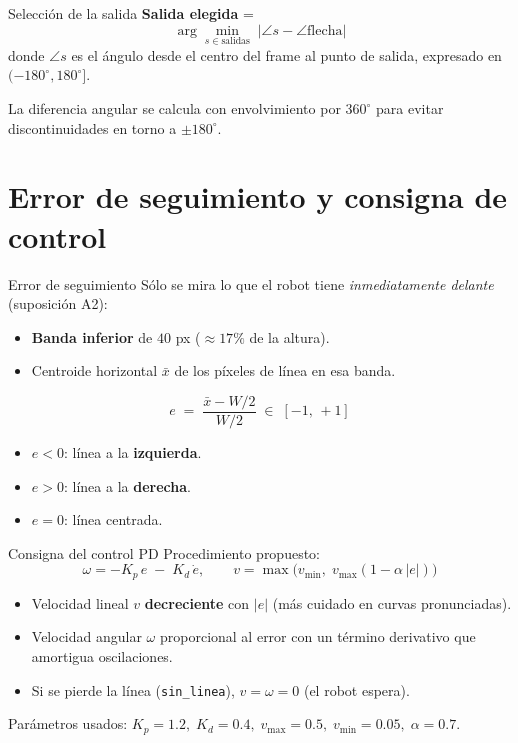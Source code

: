 \begin{frame}{Selección de la salida}
\textbf{Salida elegida} =
\[
   \arg\min_{s \in \text{salidas}}\; \bigl|\angle s - \angle \text{flecha}\bigr|
\]
donde $\angle s$ es el ángulo desde el centro del frame al punto de salida, expresado en $(-180^{\circ},180^{\circ}]$.

\medskip
La diferencia angular se calcula con envolvimiento por $360^{\circ}$ para evitar discontinuidades en torno a $\pm 180^{\circ}$.
\end{frame}


\section{Error de seguimiento y consigna de control}

\begin{frame}{Error de seguimiento}
Sólo se mira lo que el robot tiene \emph{inmediatamente delante} (suposición A2):
\begin{itemize}
  \item \textbf{Banda inferior} de $40$ px ($\approx 17\%$ de la altura).
  \item Centroide horizontal $\bar{x}$ de los píxeles de línea en esa banda.
\end{itemize}

\medskip
\[
e \;=\; \frac{\bar{x} - W/2}{W/2} \;\in\; [-1,\,+1]
\]

\begin{itemize}
  \item $e<0$: línea a la \textbf{izquierda}.
  \item $e>0$: línea a la \textbf{derecha}.
  \item $e=0$: línea centrada.
\end{itemize}
\end{frame}

\begin{frame}{Consigna del control PD}
Procedimiento propuesto:
\[
\boxed{\;\;
\omega = -K_p\, e \;-\; K_d\, \dot{e},\qquad
v = \max\!\bigl(v_{\min},\; v_{\max}(1 - \alpha\,|e|)\bigr) \;\;}
\]

\begin{itemize}
  \item Velocidad lineal $v$ \textbf{decreciente} con $|e|$ (más cuidado en curvas pronunciadas).
  \item Velocidad angular $\omega$ proporcional al error con un término derivativo que amortigua oscilaciones.
  \item Si se pierde la línea (\texttt{sin\_linea}), $v=\omega=0$ (el robot espera).
\end{itemize}

\medskip
Parámetros usados: $K_p=1.2,\;K_d=0.4,\;v_{\max}=0.5,\;v_{\min}=0.05,\;\alpha=0.7$.
\end{frame}


